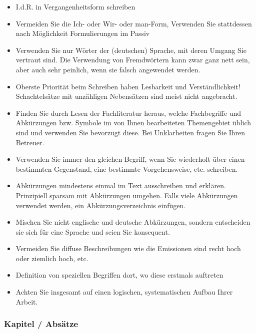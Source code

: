 \begin{itemize}
    \item I.d.R. in Vergangenheitsform schreiben
    \item Vermeiden Sie die {\glqq}Ich{\grqq}- oder {\glqq}Wir{\grqq}- oder {\glqq}man{\grqq}-Form, Verwenden Sie stattdessen nach Möglichkeit Formulierungen im Passiv
    \item Verwenden Sie nur Wörter der (deutschen) Sprache, mit deren Umgang Sie vertraut sind. Die Verwendung von Fremdwörtern kann zwar ganz nett sein, aber auch sehr peinlich, wenn sie falsch angewendet werden.
    \item Oberste Priorität beim Schreiben haben Lesbarkeit und Verständlichkeit! Schachtelsätze mit unzähligen Nebensätzen sind meist nicht angebracht.
    \item Finden Sie durch Lesen der Fachliteratur heraus, welche Fachbegriffe und Abkürzungen bzw. Symbole im von Ihnen bearbeiteten Themengebiet üblich sind und verwenden Sie bevorzugt diese. Bei Unklarheiten fragen Sie Ihren Betreuer.
    \item Verwenden Sie immer den gleichen Begriff, wenn Sie wiederholt über einen bestimmten Gegenstand, eine bestimmte Vorgehensweise, etc. schreiben.
    \item Abkürzungen mindestens einmal im Text ausschreiben und erklären. Prinzipiell sparsam mit Abkürzungen umgehen. Falls viele Abkürzungen verwendet werden, ein Abkürzungsverzeichnis einfügen.
    \item Mischen Sie nicht englische und deutsche Abkürzungen, sondern entscheiden sie sich für eine Sprache und seien Sie konsequent.
    \item Vermeiden Sie {\glqq}diffuse{\grqq} Beschreibungen wie die {\glqq}Emissionen sind recht hoch{\grqq} oder {\glqq}ziemlich hoch{\grqq}, etc.
    \item Definition von speziellen Begriffen dort, wo diese erstmals auftreten
    \item Achten Sie insgesamt auf einen logischen, systematischen Aufbau Ihrer Arbeit.
\end{itemize}

\newpage

\subsubsection{Kapitel / Absätze}

